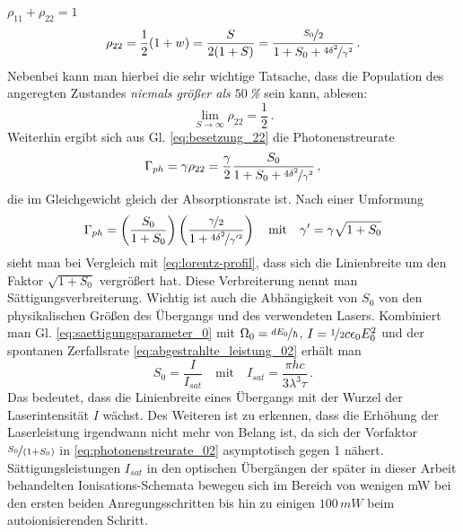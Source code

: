 $\rho_{11}+\rho_{22}=1$
\begin{equation}\label{eq:besetzung_22}
	\rho_{22}=\frac{1}{2}(1+w)=\frac{S}{2(1+S)}=\frac{\nicefrac{S_0}{2}}{1+S_0+\nicefrac{4\delta^2}{\gamma^2}}\,.
\end{equation}
Nebenbei kann man hierbei die sehr wichtige Tatsache, dass die Population des
angeregten Zustandes \textit{niemals größer als $50\,$\%} sein kann, ablesen:
\begin{equation}\label{eq:besetzung_22_kleiner-gleich_50}
	\lim_{S\to\infty}\rho_{22}=\frac{1}{2}\,.
\end{equation}
Weiterhin ergibt sich aus Gl. \eqref{eq:besetzung_22} die Photonenstreurate
\begin{equation}\label{eq:photonenstreurate_01}
	\Gamma_{ph}=\gamma\rho_{22}=\frac{\gamma}{2}\frac{S_0}{1+S_0+\nicefrac{4\delta^2}{\gamma^2}}\,,
\end{equation}
die im Gleichgewicht gleich der Absorptionsrate ist.
Nach einer Umformung
\begin{equation}\label{eq:photonenstreurate_02}
	\Gamma_{ph}=\left(\frac{S_0}{1+S_0}\right)\left(\frac{\nicefrac{\gamma}{2}}{1+\nicefrac{4\delta^2}{\gamma'^2}}\right)
	\quad\text{mit}\quad
	\gamma'=\gamma\sqrt{1+S_0}
\end{equation}
sieht man bei Vergleich mit \eqref{eq:lorentz-profil}, dass sich die
Linienbreite um den Faktor $\sqrt{1+S_0}$ vergrößert hat. Diese Verbreiterung
nennt man Sättigungsverbreiterung. Wichtig ist auch die Abhängigkeit von $S_0$
von den physikalischen Größen des Übergangs und des verwendeten Lasers.
Kombiniert man Gl. \eqref{eq:saettigungsparameter_0} mit
$\Omega_0=\nicefrac{dE_0}{\hbar}$, $I=\nicefrac{1}{2}c\epsilon_0E_0^2$ und der
spontanen Zerfallsrate \eqref{eq:abgestrahlte_leistung_02} erhält man
\begin{equation}\label{eq:saettigungsparameter_physikalische_groessen}
		S_0=\frac{I}{I_{sat}}
		\quad\text{mit}\quad
		I_{sat}=\frac{\pi hc}{3\lambda^3\tau}\,.
\end{equation}
Das bedeutet, dass die Linienbreite eines Übergangs mit der Wurzel der
Laserintensität $I$ wächst. Des Weiteren
ist zu erkennen, dass die Erhöhung der Laserleistung irgendwann nicht mehr
von Belang ist, da sich der Vorfaktor $\nicefrac{S_0}{\left(1+S_0\right)}$ in
\eqref{eq:photonenstreurate_02} asymptotisch gegen 1 nähert.
Sättigungsleistungen $I_{sat}$ in den optischen Übergängen der später in dieser
Arbeit behandelten Ionisations-Schemata bewegen sich im Bereich von wenigen
mW bei den ersten beiden Anregungsschritten bis hin zu einigen
$100\,mW$ beim autoionisierenden Schritt.

